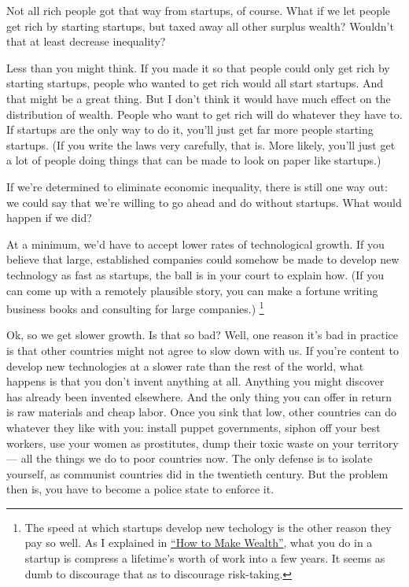 \documentclass[12pt]{book}
\begin{document}
Not all rich people got that way from startups, of course. What if we
let people get rich by starting startups, but taxed away all other
surplus wealth? Wouldn't that at least decrease inequality?

Less than you might think. If you made it so that people could only get
rich by starting startups, people who wanted to get rich would all start
startups. And that might be a great thing. But I don't think it would
have much effect on the distribution of wealth. People who want to get
rich will do whatever they have to. If startups are the only way to do
it, you'll just get far more people starting startups. (If you write the
laws very carefully, that is. More likely, you'll just get a lot of
people doing things that can be made to look on paper like startups.)

If we're determined to eliminate economic inequality, there is still one
way out: we could say that we're willing to go ahead and do without
startups. What would happen if we did?

At a minimum, we'd have to accept lower rates of technological growth.
If you believe that large, established companies could somehow be made
to develop new technology as fast as startups, the ball is in your court
to explain how. (If you can come up with a remotely plausible story, you
can make a fortune writing business books and consulting for large
companies.) \footnote{The speed at which startups develop new techology is the other
reason they pay so well. As I explained in \href{wealth.html}{``How to
Make Wealth''}, what you do in a startup is compress a lifetime's worth
of work into a few years. It seems as dumb to discourage that as to
discourage risk-taking.}

Ok, so we get slower growth. Is that so bad? Well, one reason it's bad
in practice is that other countries might not agree to slow down with
us. If you're content to develop new technologies at a slower rate than
the rest of the world, what happens is that you don't invent anything at
all. Anything you might discover has already been invented elsewhere.
And the only thing you can offer in return is raw materials and cheap
labor. Once you sink that low, other countries can do whatever they like
with you: install puppet governments, siphon off your best workers, use
your women as prostitutes, dump their toxic waste on your territory ---
all the things we do to poor countries now. The only defense is to
isolate yourself, as communist countries did in the twentieth century.
But the problem then is, you have to become a police state to enforce
it.
\end{document}
